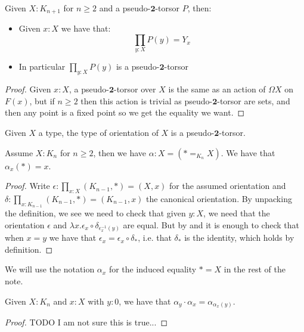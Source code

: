 \begin{lemma}\label{2-torsor-over-Kn}
Given $X:K_{n+1}$ for $n\geq 2$ and a pseudo-$\mathbf{2}$-torsor $P$, then:
\begin{itemize}
\item Given $x:X$ we have that:
\[\prod_{y:X}P(y) = Y_x\]
\item In particular $\prod_{y:X}P(y)$ is a pseudo-$\mathbf{2}$-torsor
\end{itemize}
\end{lemma}

\begin{proof}
Given $x:X$, a pseudo-$\mathbf{2}$-torsor over $X$ is the same as an action of $\Omega X$ on $F(x)$, but if $n\geq 2$ then this action is trivial as pseudo-$\mathbf{2}$-torsor are sets, and then any point is a fixed point so we get the equality we want.
\end{proof}

\begin{corollary}
Given $X$ a type, the type of orientation of $X$ is a pseudo-$\mathbf{2}$-torsor.
\end{corollary}

\begin{lemma}
Assume $X:K_n$ for $n\geq 2$, then we have $\alpha : X = (* =_{K_n} X)$. We have that $\alpha_x(*) = x$.
\end{lemma}

\begin{proof}
Write $\epsilon : \prod_{x:X} (K_{n-1},*) = (X,x)$ for the assumed orientation and $\delta : \prod_{x:K_{n-1}} (K_{n-1},*) = (K_{n-1},x)$ the canonical orientation. By unpacking the definition, we see we need to check that given $y:X$, we need that the orientation $\epsilon$ and $\lambda x.\epsilon_x\circ \delta_{\epsilon^{-1}_x(y)}$ are equal. But by  and  it is enough to check that when $x=y$ we have that $\epsilon_x = \epsilon_x\circ \delta_*$, i.e. that $\delta_*$ is the identity, which holds by definition.
\end{proof}

We will use the notation $\alpha_x$ for the induced equality $*=X$ in the rest of the note.

\begin{lemma}\label{naturality-alpha}
Given $X:K_n$ and $x:X$ with $y:0$, we have that $\alpha_y\cdot\alpha_x = \alpha_{\alpha_x(y)}$.
\end{lemma}

\begin{proof}
TODO I am not sure this is true... 
\end{proof}



